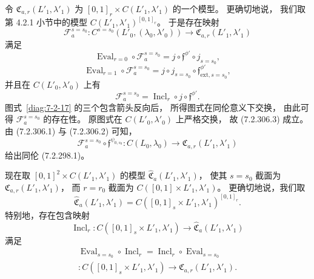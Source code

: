 
令 $\mathfrak C_{a,r}(L'_1,\lambda'_1)$
为 $[0,1]_r\times C(L'_1,\lambda'_1)$
的一个模型。
更确切地说，
我们取第 4.2.1 小节中的模型
$C(L'_1,\lambda'_1)^{[0,1]_r}$。
于是存在映射
\[
\mathcal F_a^{s=s_0}\colon
C^{s=s_0}(L'_0,(\lambda_0,\lambda'_0))
\longrightarrow
\mathfrak C_{a,r}(L'_1,\lambda'_1)
\]
满足
\begin{equation}
\operatorname{Eval}_{r=0}\circ\mathcal F_a^{s=s_0}
=j\circ\mathfrak f^{\phi'}\circ j_{s=s_0},
\tag{7.2.306.1}\label{eq:7-2-306-1}
\end{equation}
\begin{equation}
\operatorname{Eval}_{r=1}\circ\mathcal F_a^{s=s_0}
=j\circ j_{s=s_0}\circ
\mathfrak f^{\phi'}_{\mathrm{ext},s=s_0},
\tag{7.2.306.2}\label{eq:7-2-306-2}
\end{equation}
并且在 $C(L'_0,\lambda'_0)$ 上有
\begin{equation}
\mathcal F_a^{s=s_0}
=\operatorname{Incl}_r\circ j\circ\mathfrak f^{\phi'}.
\tag{7.2.306.3}\label{eq:7-2-306-3}
\end{equation}
图式~\ref{diag:7-2-17} 的三个包含箭头反向后，
所得图式在同伦意义下交换，
由此可得 $\mathcal F_a^{s=s_0}$ 的存在性。
原图式在 $C(L'_0,\lambda'_0)$ 上严格交换，
故 (7.2.306.3) 成立。
由 (7.2.306.1) 与 (7.2.306.2) 可知，
\[
\mathcal F_a^{s=s_0}\circ
\mathfrak f^{\psi_{0,s_0}}\colon
C(L_0,\lambda_0)
\longrightarrow
\mathfrak C_{a,r}(L'_1,\lambda'_1)
\]
给出同伦 (7.2.298.1)。

现在取
$[0,1]^2\times C(L'_1,\lambda'_1)$
的模型
$\widehat{\mathfrak C}_a(L'_1,\lambda'_1)$，
使其 $s=s_0$ 截面为
$\mathfrak C_{a,r}(L'_1,\lambda'_1)$，
而 $r=r_0$ 截面为
$C([0,1]\times L'_1,\lambda'_1)$。
更确切地说，我们取
\begin{equation}
\widehat{\mathfrak C}_a(L'_1,\lambda'_1)
=C([0,1]_s\times L'_1,\lambda'_1)^{[0,1]_r}.
\tag{7.2.307}\label{eq:7-2-307}
\end{equation}
特别地，存在包含映射
\[
\operatorname{Incl}_r\colon
C([0,1]_s\times L'_1,\lambda'_1)
\longrightarrow
\widehat{\mathfrak C}_a(L'_1,\lambda'_1)
\]
满足
\begin{equation}
\begin{gathered}
\operatorname{Eval}_{s=s_0}\circ\operatorname{Incl}_r
=\operatorname{Incl}_r\circ\operatorname{Eval}_{s=s_0}\\
\colon C([0,1]_s\times L'_1,\lambda'_1)
\longrightarrow
\mathfrak C_{a,r}(L'_1,\lambda'_1).
\end{gathered}
\tag{7.2.308}\label{eq:7-2-308}
\end{equation}

